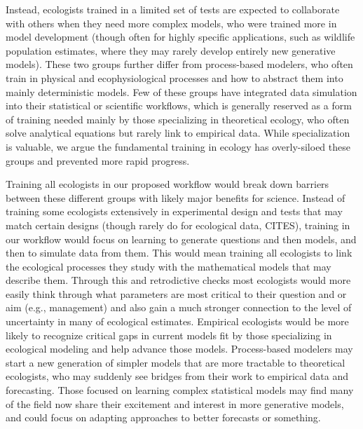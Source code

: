 \documentclass[11pt]{article}
\begin{document}
Instead, ecologists trained in a limited set of tests are expected to collaborate with others when they need more complex models, who were trained more in model development (though often for highly specific applications, such as wildlife population estimates, where they may rarely develop entirely new generative models). These two groups further differ from process-based modelers, who often train in physical and ecophysiological processes and how to abstract them into mainly deterministic models. %
Few of these groups have integrated data simulation into their statistical or scientific workflows, which is generally reserved as a form of training needed mainly by those specializing in theoretical ecology, who often solve analytical equations but rarely link to empirical data. While specialization is valuable, we argue the fundamental training in ecology has overly-siloed these groups and prevented more rapid progress.

Training all ecologists in our proposed workflow would break down barriers between these different groups with likely major benefits for science. %
Instead of training some ecologists extensively in experimental design and tests that may match certain designs (though rarely do for ecological data, CITES), training in our workflow would focus on learning to generate questions and then models, and then to simulate data from them. This would mean training all ecologists to link the ecological processes they study with the mathematical models that may describe them. Through this and retrodictive checks most ecologists would more easily think through what parameters are most critical to their question and or aim (e.g., management) and also gain a much stronger connection to the level of uncertainty in many of ecological estimates. Empirical ecologists would be more likely to recognize critical gaps in current models fit by those specializing in ecological modeling and help advance those models. Process-based modelers may start a new generation of simpler models that are more tractable to theoretical ecologists, who may suddenly see bridges from their work to empirical data and forecasting. 
Those focused on learning complex statistical models may find many of the field now share their excitement and interest in more generative models, and could focus on adapting approaches to better forecasts or something. %
\end{document}
